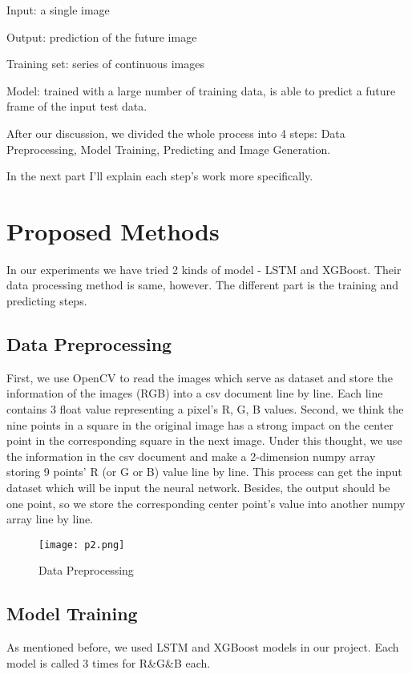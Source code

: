 \documentclass{acmtog} %
\begin{document}
Input: a single image

Output: prediction of the future image

Training set: series of continuous images

Model: trained with a large number of training data, is able to predict a future frame of the input test data.

After our discussion, we divided the whole process into 4 steps: Data Preprocessing, Model Training, Predicting and Image Generation. 

In the next part I’ll explain each step’s work more specifically.

\section{Proposed Methods}
\label{sub:Proposed Methods}
In our experiments we have tried 2 kinds of model - LSTM and XGBoost. Their data processing method is same, however. The different part is the training and predicting steps. 
\subsection{Data Preprocessing}
\label{subsub:Data Preprocessing}
%
First, we use OpenCV to read the images which serve as dataset and store the information of the images (RGB) into a csv document line by line. Each line contains 3 float value representing a pixel’s R, G, B values.
Second, we think the nine points in a square in the original image has a strong impact on the center point in the corresponding square in the next image. Under this thought, we use the information in the csv document and make a 2-dimension numpy array storing 9 points’ R (or G or B) value line by line. This process can get the input dataset which will be input the neural network. Besides, the output should be one point, so we store the corresponding center point’s value into another numpy array line by line.
%
\begin{figure}[h]
\centerline{\texttt{[image: p2.png]}}
\caption{Data Preprocessing}
    \label{fig:Longtin_v_Moon_right_and_comparison}
\end{figure}
%
\subsection{Model Training}
\label{subsub:Model Training}
As mentioned before, we used LSTM and XGBoost models in our project. Each model is called 3 times for R&G&B each.
\end{document}
